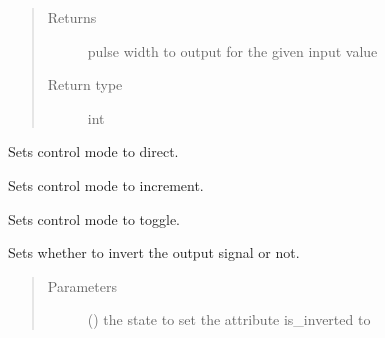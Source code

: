 \documentclass[letterpaper,10pt,english]{sphinxmanual}
\begin{document}
\begin{fulllineitems}
\begin{fulllineitems}
\begin{quote}
\begin{description}
\item[{Returns}] \leavevmode
\sphinxAtStartPar
pulse width to output for the given input value

\item[{Return type}] \leavevmode
\sphinxAtStartPar
int

\end{description}\end{quote}

\end{fulllineitems}


\begin{fulllineitems}
\label{\detokenize{specific:EarOutput.EarOutput.set_control_direct}}
\sphinxAtStartPar
Sets control mode to direct.

\end{fulllineitems}


\begin{fulllineitems}
\label{\detokenize{specific:EarOutput.EarOutput.set_control_increment}}
\sphinxAtStartPar
Sets control mode to increment.

\end{fulllineitems}


\begin{fulllineitems}
\label{\detokenize{specific:EarOutput.EarOutput.set_control_toggle}}
\sphinxAtStartPar
Sets control mode to toggle.

\end{fulllineitems}


\begin{fulllineitems}
\label{\detokenize{specific:EarOutput.EarOutput.set_inversion}}
\sphinxAtStartPar
Sets whether to invert the output signal or not.
\begin{quote}\begin{description}
\item[{Parameters}] \leavevmode
\sphinxAtStartPar
{} () \textendash{} the state to set the attribute is\_inverted to


\end{description}
\end{quote}
\end{fulllineitems}
\end{fulllineitems}
\end{document}
